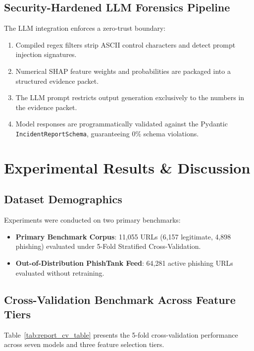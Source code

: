 \documentclass[12pt,a4paper,oneside]{report}
\begin{document}
\section{Security-Hardened LLM Forensics Pipeline}
The LLM integration enforces a zero-trust boundary:
\begin{enumerate}
    \item Compiled regex filters strip ASCII control characters and detect prompt injection signatures.
    \item Numerical SHAP feature weights and probabilities are packaged into a structured evidence packet.
    \item The LLM prompt restricts output generation exclusively to the numbers in the evidence packet.
    \item Model responses are programmatically validated against the Pydantic \texttt{IncidentReportSchema}, guaranteeing 0\% schema violations.
\end{enumerate}

\chapter{Experimental Results \& Discussion}

\section{Dataset Demographics}
Experiments were conducted on two primary benchmarks:
\begin{itemize}
    \item \textbf{Primary Benchmark Corpus}: 11,055 URLs (6,157 legitimate, 4,898 phishing) evaluated under 5-Fold Stratified Cross-Validation.
    \item \textbf{Out-of-Distribution PhishTank Feed}: 64,281 active phishing URLs evaluated without retraining.
\end{itemize}

\section{Cross-Validation Benchmark Across Feature Tiers}
Table~\ref{tab:report_cv_table} presents the 5-fold cross-validation performance across seven models and three feature selection tiers.
\end{document}
